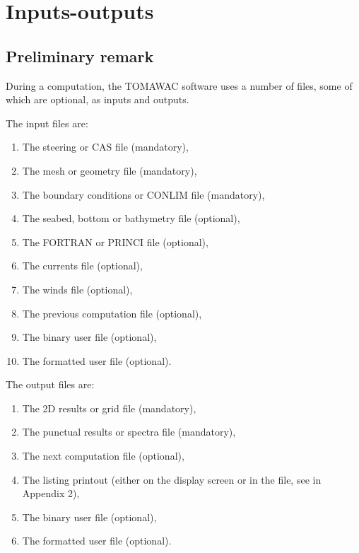 \chapter{ Inputs-outputs}

\section{ Preliminary remark}

 During a computation, the TOMAWAC software uses a number of files, some of which are optional, as inputs and outputs.

 The input files are:

\begin{enumerate}
\item  The steering or CAS file (mandatory),

\item  The mesh or geometry file (mandatory),

\item  The boundary conditions or CONLIM file (mandatory),

\item  The seabed, bottom or bathymetry file (optional),

\item  The FORTRAN or PRINCI file (optional),

\item  The currents file (optional),

\item  The winds file (optional),

\item  The previous computation file (optional),

\item  The binary user file (optional),

\item  The formatted user file (optional).
\end{enumerate}

The output files are:

\begin{enumerate}
\item  The 2D results or grid file (mandatory),

\item  The punctual results or spectra file (mandatory),

\item  The next computation file (optional),

\item  The listing printout (either on the display screen or in the file, see in Appendix 2),

\item  The binary user file (optional),

\item  The formatted user file (optional).
\end{enumerate}


